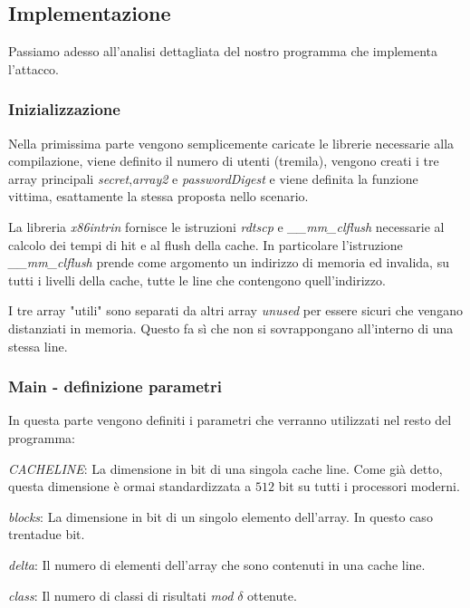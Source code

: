 			\subsection{Implementazione}
				Passiamo adesso all'analisi dettagliata del nostro programma che implementa l'attacco.
				
				\subsubsection{Inizializzazione}
				
				Nella primissima parte vengono semplicemente caricate le librerie necessarie alla compilazione, viene definito il numero di utenti (tremila), vengono creati i tre array principali \emph{secret},\emph{array2} e \emph{passwordDigest} e viene definita la funzione vittima, esattamente la stessa proposta nello scenario.
				
 				La libreria \emph{x86intrin} fornisce le istruzioni \emph{rdtscp} e \emph{\_\_mm\_clflush} necessarie al calcolo dei tempi di hit e al flush della cache. In particolare l'istruzione \emph{\_\_mm\_clflush} prende come argomento un indirizzo di memoria ed invalida, su tutti i livelli della cache, tutte le line che contengono quell'indirizzo.
				
				I tre array "utili" sono separati da altri array \emph{unused} per essere sicuri che vengano distanziati in memoria. Questo fa sì che non si sovrappongano all'interno di una stessa line.
				
				\subsubsection{Main - definizione parametri}
				
				In questa parte vengono definiti i parametri che verranno utilizzati nel resto del programma:

					\emph{CACHELINE}: La dimensione in bit di una singola cache line. Come già detto, questa dimensione è ormai standardizzata a $512$ bit su tutti i processori moderni.
					
					\emph{blocks}: La dimensione in bit di un singolo elemento dell'array. In questo caso trentadue bit.
					
					\emph{delta}: Il numero di elementi dell'array che sono contenuti in una cache line.
					
					\emph{class}: Il numero di classi di risultati \emph{mod} $\delta$ ottenute.
					
